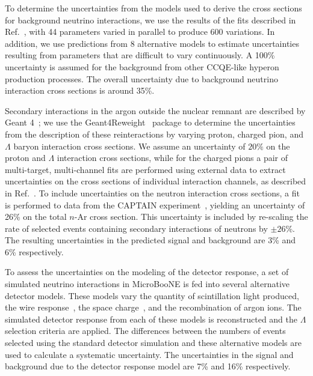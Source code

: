 \documentclass[aps,prl,twocolumn,superscriptaddress]{revtex4}
\begin{document}
To determine the uncertainties from the models used to derive the cross sections for background neutrino interactions, we use the results of the fits described in Ref.~\cite{MicroBooNE:2021ccs}, with 44 parameters varied in parallel to produce 600 variations. In addition, we use predictions from 8 alternative models to estimate uncertainties resulting from parameters that are difficult to vary continuously. A 100\% uncertainty is assumed for the background from other CCQE-like hyperon production processes. The overall uncertainty due to background neutrino interaction cross sections is around 35\%.

Secondary interactions in the argon outside the nuclear remnant are described by {\sc Geant} 4~\cite{GEANT4:2002zbu}; we use the Geant4Reweight~\cite{Calcutt:2021zck} package to determine the uncertainties from the description of these reinteractions by varying proton, charged pion, and $\Lambda$ baryon interaction cross sections. We assume an uncertainty of $20\%$ on the proton and $\Lambda$ interaction cross sections, while for the charged pions a pair of multi-target, multi-channel fits are performed using external data to extract uncertainties on the cross sections of individual interaction channels, as described in Ref.~\cite{Calcutt:2021zck}.  To include uncertainties on the neutron interaction cross sections, a fit is performed to data from the CAPTAIN experiment~\cite{CAPTAIN:2019fxo}, yielding an uncertainty of 26\% on the total $n$-Ar cross section. This uncertainty is included by re-scaling the rate of selected events containing secondary interactions of neutrons by $\pm 26$\%. The resulting uncertainties in the predicted signal and background are 3\% and 6\% respectively.


To assess the uncertainties on the modeling of the detector response, a set of simulated neutrino interactions in MicroBooNE is fed into several alternative detector models. These models vary the quantity of scintillation light produced, the wire response~\cite{MicroBooNE:2021roa,MicroBooNE:2019efx}, the space charge~\cite{MicroBooNE:2019koz,MicroBooNE:2020kca}, and the recombination of argon ions. The simulated detector response from each of these models is reconstructed and the $\Lambda$ selection criteria are applied. The differences between the numbers of events selected using the standard detector simulation and these alternative models are used to calculate a systematic uncertainty. The uncertainties in the signal and background due to the detector response model are 7\% and 16\% respectively.
\end{document}
